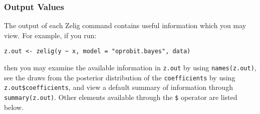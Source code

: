 \subsubsection{Output Values}

The output of each Zelig command contains useful information which you may
view. For example, if you run:
\begin{verbatim}
z.out <- zelig(y ~ x, model = "oprobit.bayes", data)
\end{verbatim}

\noindent then you may examine the available information in \texttt{z.out} by
using \texttt{names(z.out)}, see the draws from the posterior
distribution of the \texttt{coefficients} by using
\texttt{z.out\$coefficients}, and view a default summary of
information through \texttt{summary(z.out)}. Other elements available
through the \texttt{\$} operator are listed below.

